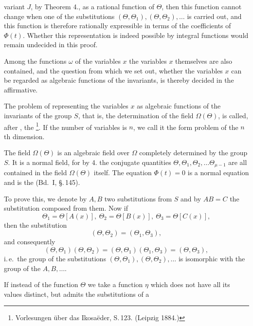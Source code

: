 variant $J$, by Theorem 4., as a rational function of $\Theta$,
then this function cannot change when one of the substitutions
$(\Theta, \Theta_1), (\Theta, \Theta_2), \dots$ is carried out, and this function
is therefore rationally expressible in terms of the coefficients of $\Phi(t)$.
Whether this representation is indeed possible by integral functions
would remain undecided in this proof.

Among the functions $\omega$ of the variables $x$ the
variables $x$ themselves are also contained, and the question from which we
set out, whether the variables $x$ can be regarded as algebraic functions
of the invariants, is thereby decided in the
affirmative.

The problem of representing the variables $x$ as algebraic functions
of the invariants of the group $S$, that is, the determination
of the field $\Omega(\Theta)$, is called, after , the \footnote{Vorlesungen über das Ikosaëder, S.\,123. (Leipzig 1884.)}. If the number of variables is $n$, we call
it the form problem of the $n$th dimension.

The field $\Omega(\Theta)$ is an algebraic field over $\Omega$ completely determined
by the group $S$. It is a normal field,
for by 4. the conjugate quantities $\Theta, \Theta_1, \Theta_2, \dots \Theta_{\mu-1}$
are all contained in the field $\Omega(\Theta)$ itself. The equation $\Phi(t) = 0$
is a normal equation and is the  (Bd.\ I, \S.\,145).


To prove this, we denote by $A, B$ two substitutions
from $S$ and by $AB = C$ the substitution composed
from them. Now if
\[ \Theta_1 = \Theta[A(x)],\ \Theta_2 = \Theta[B(x)],\ \Theta_3 = \Theta[C(x)], \]
then the substitution
\[ (\Theta, \Theta_2) = (\Theta_1, \Theta_3), \]
and consequently
\[ (\Theta, \Theta_1)(\Theta, \Theta_2) = (\Theta, \Theta_1)(\Theta_1, \Theta_3) = (\Theta, \Theta_3), \]
i.\,e.\ the group of the substitutions $(\Theta, \Theta_1), (\Theta, \Theta_2), \dots$ is
isomorphic with the group of the $A, B, \dots$.

If instead of the function $\Theta$ we take a function $\eta$ which does not
have all its values distinct, but admits the substitutions of a
